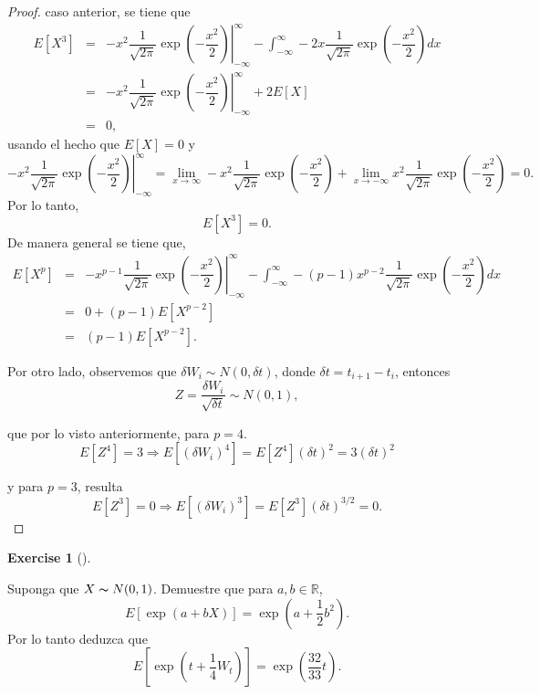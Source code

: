 \documentclass[
  letterpaper,
  DIV=11,
  numbers=noendperiod]{scrreprt}
\theoremstyle{plain}
\theoremstyle{definition}
\newtheorem{exercise}{Exercise}[chapter]
\theoremstyle{remark}
\begin{document}
\begin{proof}
caso anterior, se tiene que \[
\begin{eqnarray*}
    E\left[X^{3}\right] & = & \left.-x^{2}\dfrac{1}{\sqrt{2\pi}}\exp{\left(-\dfrac{x^{2}}{2}\right)}\right|_{-\infty}^{\infty}-\int_{-\infty}^{\infty} -2x\dfrac{1}{\sqrt{2\pi}}\exp{\left(-\dfrac{x^{2}}{2}\right)}dx\\
     & = & \left.-x^{2}\dfrac{1}{\sqrt{2\pi}}\exp{\left(-\dfrac{x^{2}}{2}\right)}\right|_{-\infty}^{\infty}+2E[X]\\
     & = & 0,
\end{eqnarray*}
\] usando el hecho que \(E[X]=0\) y \[
\left.-x^{2}\dfrac{1}{\sqrt{2\pi}}\exp{\left(-\dfrac{x^{2}}{2}\right)}\right|_{-\infty}^{\infty}=\lim_{x\to\infty}-x^{2}\dfrac{1}{\sqrt{2\pi}}\exp{\left(-\dfrac{x^{2}}{2}\right)}+\lim_{x\to-\infty}x^{2}\dfrac{1}{\sqrt{2\pi}}\exp{\left(-\dfrac{x^{2}}{2}\right)}=0.
\] Por lo tanto, \[
 E\left[X^{3}\right]=0.
 \] De manera general se tiene que, \[
\begin{eqnarray*}
    E\left[X^{p}\right] & = & \left.-x^{p-1}\dfrac{1}{\sqrt{2\pi}}\exp{\left(-\dfrac{x^{2}}{2}\right)}\right|_{-\infty}^{\infty}-\int_{-\infty}^{\infty} -(p-1)x^{p-2}\dfrac{1}{\sqrt{2\pi}}\exp{\left(-\dfrac{x^{2}}{2}\right)}dx\\
     & = & 0+(p-1)E[X^{p-2}]\\
     & = & (p-1)E[X^{p-2}].
\end{eqnarray*}
\]

Por otro lado, observemos que
\(\delta W_{i}\sim N\left(0,\delta t\right)\), donde
\(\delta t=t_{i+1}-t_{i}\), entonces \[
Z=\dfrac{\delta W_{i}}{\sqrt{\delta t}}\sim N\left(0,1\right),
\]

que por lo visto anteriormente, para \(p=4\). \[
E\left[Z^{4}\right]=3\Longrightarrow E[(\delta W_{i})^{4}]=E[Z^{4}](\delta t )^{2}=3(\delta t )^{2}
\]

y para \(p=3\), resulta \[
E[Z^{3}]=0\Longrightarrow E[(\delta W_{i})^{3}]=E[Z^{3}](\delta t )^{3/2}=0.
\]

\end{proof}

\begin{exercise}[]\protect\hypertarget{exr-5}{}\label{exr-5}

Suponga que \(X\thicksim N(0,1)\). Demuestre que para
\(a, b\in\mathbb{R}\), \[
E[\exp(a+bX)]=\exp\left(a+\frac{1}{2}b^{2}\right).
\] Por lo tanto deduzca que \[
E[\exp(t+\frac{1}{4}W_{t})]=\exp\left(\frac{32}{33}t\right).
\]

\end{exercise}
\end{document}
